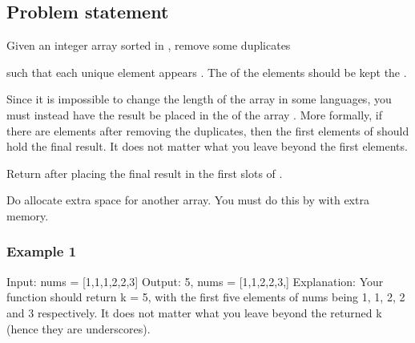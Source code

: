 \documentclass[letterpaper,12pt,english]{book}
\begin{document}
\subsection{Problem statement\sphinxfootnotemark[87]}
\label{\detokenize{Sorting/04_SORT_80_Remove_Duplicates_from_Sorted_Array:problem-statement}}%
\begin{footnotetext}[87]\sphinxAtStartFootnote
{}
%
\end{footnotetext}\ignorespaces 
\sphinxAtStartPar
Given an integer array  sorted in , remove some duplicates %
\begin{footnote}[88]\sphinxAtStartFootnote
{}
%
\end{footnote} such that each unique element appears . The  of the elements should be kept the .

\sphinxAtStartPar
Since it is impossible to change the length of the array in some languages, you must instead have the result be placed in the  of the array . More formally, if there are  elements after removing the duplicates, then the first  elements of  should hold the final result. It does not matter what you leave beyond the first  elements.

\sphinxAtStartPar
Return  after placing the final result in the first  slots of .

\sphinxAtStartPar
Do  allocate extra space for another array. You must do this by  with  extra memory.


\subsubsection{Example 1}
\label{\detokenize{Sorting/04_SORT_80_Remove_Duplicates_from_Sorted_Array:example-1}}
\begin{sphinxVerbatim}[commandchars=\\\{\}]
Input: nums = [1,1,1,2,2,3]
Output: 5, nums = [1,1,2,2,3,\PYGZus{}]
Explanation: Your function should return k = 5, with the first five elements of nums being 1, 1, 2, 2 and 3 respectively.
It does not matter what you leave beyond the returned k (hence they are underscores).
\end{sphinxVerbatim}
\end{document}
